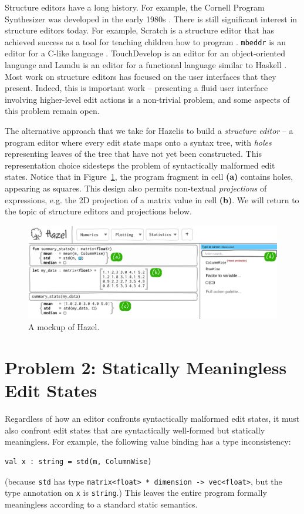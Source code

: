 \documentclass[letterpaper,USenglish]{lipics-v2016}
\let\li\lstinline
\newcommand{\Hazel}[0]{\textsf{Hazel}}
\newcommand{\HazelEnv}[0]{\Hazel}
\begin{document}
Structure editors have a long history. For example, the Cornell Program
Synthesizer was developed in the early 1980s \cite{teitelbaum_cornell_1981}. There is still significant   
 interest in structure editors today. For example,  Scratch is a 
structure editor that has achieved success as a tool for teaching children
how to program \cite{Resnick:2009:SP:1592761.1592779}. \texttt{mbeddr} is an editor for a C-like
language \cite{voelter_mbeddr:_2012}. TouchDevelop is an editor for an
object-oriented language \cite{tillmann_touchdevelop:_2011} and Lamdu is an
editor for a functional language similar to Haskell \cite{lamdu}. Most work on structure editors has focused on the user
interfaces that they present. Indeed, this is important work -- presenting a
fluid user interface involving higher-level edit actions is a non-trivial
problem, and some aspects of this problem remain open.

The alternative approach that we take for \HazelEnv is to build a
\emph{structure editor} -- a program editor where every edit state
maps onto a syntax tree, with \emph{holes} representing leaves of the tree
that have not yet been constructed.  This representation choice sidesteps the
problem of syntactically malformed edit states. Notice that in
Figure~\ref{fig:hazel-mockup}, the program fragment in cell
\textbf{(a)} contains holes, appearing as squares. This design also permits
non-textual \emph{projections} of expressions, e.g. 
the 2D projection of a matrix value in cell \textbf{(b)}.
We will return to the topic of structure editors and projections below.


\begin{figure}
\includegraphics[width=1.025\textwidth]{mockup-1}
\caption{A mockup of \HazelEnv.}
\label{fig:hazel-mockup}
\end{figure}

\section{Problem 2: Statically Meaningless Edit States} 
Regardless of how an 
editor confronts syntactically malformed edit states, it must also confront 
edit states that are syntactically well-formed but statically meaningless. For
example, the following value binding has a type inconsistency:
\begin{lstlisting}[numbers=none]
val x : string = std(m, ColumnWise)
\end{lstlisting}
(because \li{std} has type \li{matrix<float> * dimension -> vec<float>},
but the type annotation on \li{x} is \li{string}.) This leaves the entire program
formally meaningless according to a standard static semantics.
\end{document}
